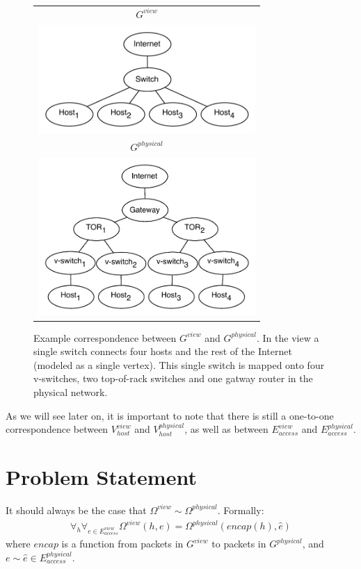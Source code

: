 \documentclass{sig-alternate-10pt}
\begin{document}
\begin{figure}[t]
\hspace{-10pt}
\begin{tabular}{c}
    $G^{view}$ \\
    \includegraphics[width=3.25in]{../diagrams/necula_views/app_view.pdf}  \\
    $G^{physical}$ \\
    \includegraphics[width=3.25in]{../diagrams/necula_views/physical_view.pdf}
\end{tabular}
\caption[]{\label{fig:view_and_physical} Example correspondence between
$G^{view}$ and $G^{physical}$. In the view a single switch connects 
four hosts and the rest of the Internet (modeled as a single vertex).
This single switch is mapped onto four v-switches, two top-of-rack switches 
and one gatway router in the physical network.}
\end{figure}

As we will see later on, it is important to note that there is still a one-to-one correspondence
between $V_{host}^{view}$ and $V_{host}^{physical}$, as well as between
$E_{access}^{view}$ and $E_{access}^{physical}$.

\section{Problem Statement}

It should always be the case that 
$\Omega^{view} \sim \Omega^{physical}$. Formally:
\begin{align*}
\forall_{h} \forall_{e \in E_{access}^{view}} \Omega^{view}(h,e) =
\Omega^{physical}(encap(h),\hat{e}) 
\end{align*}
where $encap$ is a function from packets in $G^{view}$ to packets in
$G^{physical}$, and $e \sim \hat{e} \in E_{access}^{physical}$.
\end{document}
